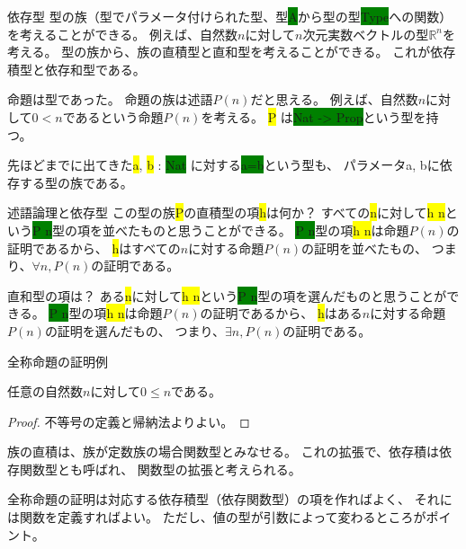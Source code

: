 \documentclass[unicode,12pt]{beamer}%
\newcommand{\type}[1]{\colorbox{green}{#1}}
\newcommand{\term}[1]{\colorbox{yellow}{#1}}
\begin{document}
\begin{frame}{依存型}
  型の族（型でパラメータ付けられた型、型\type{A}から型の型\type{Type}への関数）を考えることができる。
  例えば、自然数$n$に対して$n$次元実数ベクトルの型$\mathbb{R}^n$を考える。
  型の族から、族の直積型と直和型を考えることができる。
  これが依存積型と依存和型である。

  \pause

  命題は型であった。
  命題の族は述語$P(n)$だと思える。
  例えば、自然数$n$に対して$0<n$であるという命題$P(n)$を考える。
  \term{P} は\type{Nat -> Prop}という型を持つ。

  \pause

  先ほどまでに出てきた\term{a}, \term{b} : \type{Nat} に対する\type{a=b}という型も、
  パラメータa, bに依存する型の族である。
\end{frame}

\begin{frame}{述語論理と依存型}
  この型の族\term{P}の直積型の項\term{h}は何か？
  すべての\term{n}に対して\term{h n}という\type{P n}型の項を並べたものと思うことができる。
  \type{P n}型の項\term{h n}は命題$P(n)$の証明であるから、
  \term{h}はすべての$n$に対する命題$P(n)$の証明を並べたもの、
  つまり、$\forall n, P(n)$の証明である。

  \pause

  直和型の項は？
  ある\term{n}に対して\term{h n}という\type{P n}型の項を選んだものと思うことができる。
  \type{P n}型の項\term{h n}は命題$P(n)$の証明であるから、
  \term{h}はある$n$に対する命題$P(n)$の証明を選んだもの、
  つまり、$\exists n, P(n)$の証明である。
\end{frame}

\begin{frame}{全称命題の証明例}
  \begin{theorem}
    任意の自然数$n$に対して$0\leq n$である。
  \end{theorem}

  \begin{proof}
    不等号の定義と帰納法よりよい。
  \end{proof}

  \pause
  族の直積は、族が定数族の場合関数型とみなせる。
  これの拡張で、依存積は依存関数型とも呼ばれ、
  関数型の拡張と考えられる。

  \pause

  全称命題の証明は対応する依存積型（依存関数型）の項を作ればよく、
  それには関数を定義すればよい。
  ただし、値の型が引数によって変わるところがポイント。
\end{frame}
\end{document}
